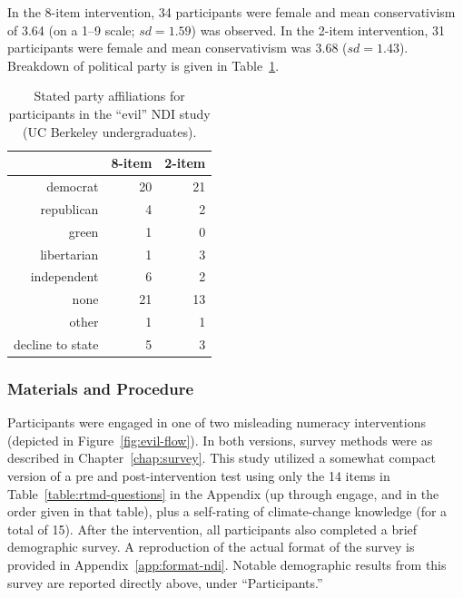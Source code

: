 In the 8-item intervention, 34 participants were female and mean conservativism
of 3.64 (on a 1--9 scale; $sd=1.59$) was observed. In the 2-item intervention,
31 participants were female and mean conservativism was 3.68 ($sd=1.43$).
Breakdown of political party is given in Table~\ref{table:evil-party}.

\begin{table}[ht]
\caption{Stated party affiliations for participants in the “evil” NDI study (UC
    Berkeley undergraduates).}
\label{table:evil-party}
\centering
\begin{tabular}{rrr}
  \toprule
     & 8-item & 2-item \\ 
  \midrule
  democrat &  20 &  21 \\ 
  republican &   4 &   2 \\ 
  green &   1 &   0 \\ 
  libertarian &   1 &   3 \\ 
  independent &   6 &   2 \\ 
  none &  21 &  13 \\ 
  other &   1 &   1 \\ 
  decline to state &   5 &   3 \\ 
   \bottomrule
\end{tabular}
\end{table}

\subsubsection{Materials and Procedure}

Participants were engaged in one of two misleading numeracy
interventions (depicted in Figure~\ref{fig:evil-flow}). In both versions, survey
methods were as described in Chapter~\ref{chap:survey}. This study utilized a
somewhat compact version of a pre and post-intervention test using only the 14
items in Table~\ref{table:rtmd-questions} in the Appendix (up through
\textsf{engage}, and in the order given in that table), plus a self-rating of
climate-change knowledge (for a total of 15).  After the intervention, all
participants also completed a brief demographic survey.  A reproduction of the
actual format of the survey is provided in Appendix~\ref{app:format-ndi}.
Notable demographic results from this survey are reported directly above, under
“Participants.”


